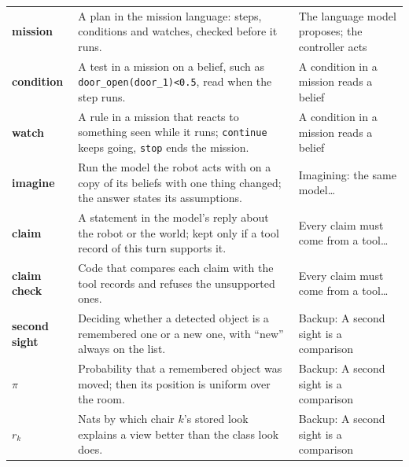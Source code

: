 \documentclass[11pt]{article}
\begin{document}
\begin{longtable}{@{}>{\raggedright\bfseries}p{2.8cm} p{8.9cm} >{\raggedright\arraybackslash}p{4.2cm}@{}}
mission & A plan in the mission language: steps, conditions and watches, checked before it runs. & The language model proposes; the controller acts\\
condition & A test in a mission on a belief, such as \texttt{door\_open(door\_1)<0.5}, read when the step runs. & A condition in a mission reads a belief\\
watch & A rule in a mission that reacts to something seen while it runs; \texttt{continue} keeps going, \texttt{stop} ends the mission. & A condition in a mission reads a belief\\
imagine & Run the model the robot acts with on a copy of its beliefs with one thing changed; the answer states its assumptions. & Imagining: the same model\ldots\\
claim & A statement in the model's reply about the robot or the world; kept only if a tool record of this turn supports it. & Every claim must come from a tool\ldots\\
claim check & Code that compares each claim with the tool records and refuses the unsupported ones. & Every claim must come from a tool\ldots\\
second sight & Deciding whether a detected object is a remembered one or a new one, with ``new'' always on the list. & Backup: A second sight is a comparison\\
$\pi$ & Probability that a remembered object was moved; then its position is uniform over the room. & Backup: A second sight is a comparison\\
$r_k$ & Nats by which chair $k$'s stored look explains a view better than the class look does. & Backup: A second sight is a comparison\\
\bottomrule
\end{longtable}
\end{document}
